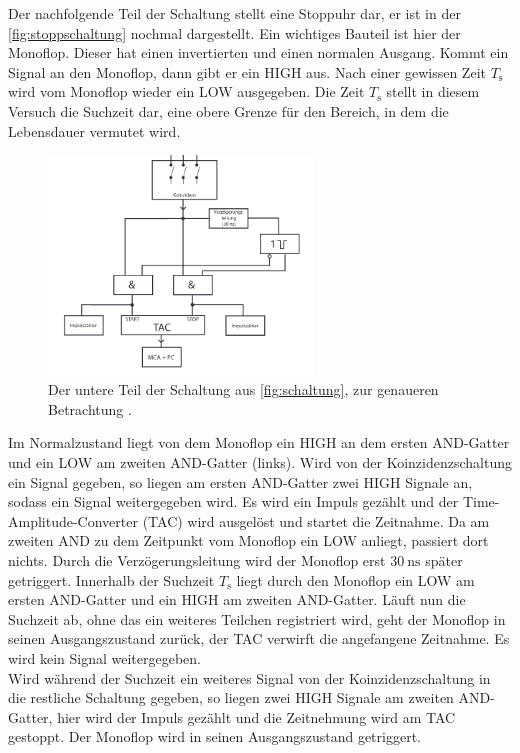 \noindent Der nachfolgende Teil der Schaltung stellt eine Stoppuhr dar, er ist in der \autoref{fig:stoppschaltung} nochmal dargestellt. Ein wichtiges Bauteil ist hier der Monoflop. Dieser hat einen invertierten und einen normalen Ausgang. Kommt ein 
Signal an den Monoflop, dann gibt er ein HIGH aus. Nach einer gewissen Zeit $T_\text{s}$ wird vom Monoflop wieder ein LOW ausgegeben. Die Zeit $T_\text{s}$ stellt in diesem Versuch die 
Suchzeit dar, eine obere Grenze für den Bereich, in dem die Lebensdauer vermutet wird. \\
\begin{figure}
    \includegraphics[width=7cm]{bilder/unten_schaltung.png}
    \caption{Der untere Teil der Schaltung aus \autoref{fig:schaltung}, zur genaueren Betrachtung \cite{anleitung}.}
    \label{fig:stoppschaltung}
\end{figure}
Im Normalzustand liegt von dem Monoflop ein HIGH an dem ersten AND-Gatter und ein LOW am zweiten AND-Gatter (links). Wird von der Koinzidenzschaltung ein Signal gegeben, so liegen am 
ersten AND-Gatter zwei HIGH Signale an, sodass ein Signal weitergegeben wird. Es wird ein Impuls gezählt und der Time-Amplitude-Converter (TAC) wird ausgelöst und startet die Zeitnahme. 
Da am zweiten AND zu dem Zeitpunkt vom Monoflop ein LOW anliegt, passiert dort nichts. Durch die Verzögerungsleitung wird der Monoflop erst $\SI{30}{\nano\second}$ später getriggert. 
Innerhalb der Suchzeit $T_\text{s}$ liegt durch den Monoflop ein LOW am ersten AND-Gatter und ein HIGH am zweiten AND-Gatter.
Läuft nun die Suchzeit ab, ohne das ein weiteres Teilchen registriert wird, geht der Monoflop in seinen Ausgangszustand zurück, der TAC verwirft die angefangene Zeitnahme. Es wird kein 
Signal weitergegeben. \\
Wird während der Suchzeit ein weiteres Signal von der Koinzidenzschaltung in die restliche Schaltung gegeben, so liegen zwei HIGH Signale am zweiten AND-Gatter, hier wird der Impuls 
gezählt und die Zeitnehmung wird am TAC gestoppt. Der Monoflop wird in seinen Ausgangszustand getriggert. \\
